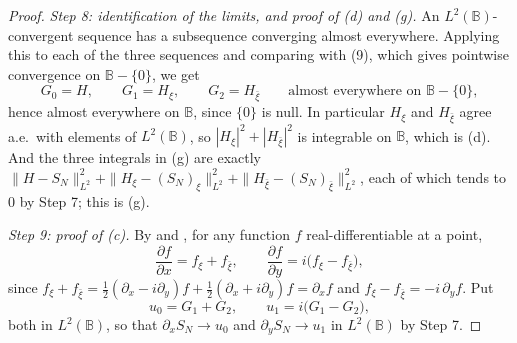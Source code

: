 \begin{proof}
\emph{Step 8: identification of the limits, and proof of (d) and (g).}  An
$L^2(\mathbb{B})$-convergent sequence has a subsequence converging almost
everywhere.  Applying this to each of the three sequences and comparing with
(9), which gives pointwise convergence on $\mathbb{B}-\{0\}$, we get
\[
  G_0=H,\qquad G_1=H_\xi,\qquad G_2=H_{\bar\xi}
  \qquad\text{almost everywhere on }\mathbb{B}-\{0\},
\]
hence almost everywhere on $\mathbb{B}$, since $\{0\}$ is null.  In particular
$H_\xi$ and $H_{\bar\xi}$ agree a.e.\ with elements of $L^2(\mathbb{B})$, so
$|H_\xi|^2+|H_{\bar\xi}|^2$ is integrable on $\mathbb{B}$, which is (d).  And
the three integrals in (g) are exactly
$\|H-S_N\|_{L^2}^2+\|H_\xi-(S_N)_\xi\|_{L^2}^2
+\|H_{\bar\xi}-(S_N)_{\bar\xi}\|_{L^2}^2$, each of which tends to $0$ by
Step 7; this is (g).

\emph{Step 9: proof of (c).}  By  and , for any
function $f$ real-differentiable at a point,
\[
  \frac{\partial f}{\partial x}=f_\xi+f_{\bar\xi},\qquad
  \frac{\partial f}{\partial y}=i\bigl(f_\xi-f_{\bar\xi}\bigr),
\]
since $f_\xi+f_{\bar\xi}=\tfrac12(\partial_x-i\partial_y)f
+\tfrac12(\partial_x+i\partial_y)f=\partial_xf$ and
$f_\xi-f_{\bar\xi}=-i\,\partial_yf$.  Put
\[
  u_0=G_1+G_2,\qquad u_1=i\bigl(G_1-G_2\bigr),
\]
both in $L^2(\mathbb{B})$, so that $\partial_xS_N\to u_0$ and
$\partial_yS_N\to u_1$ in $L^2(\mathbb{B})$ by Step 7.


\end{proof}
